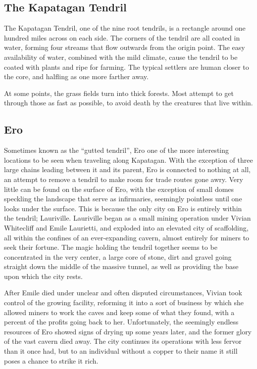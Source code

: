 \begin{multicols}{2}
\section{The Kapatagan Tendril}
The Kapatagan Tendril, one of the nine root tendrils, is a rectangle around one hundred miles across on each side.
The corners of the tendril are all coated in water, forming four streams that flow outwards from the origin point.
The easy availability of water, combined with the mild climate, cause the tendril to be coated with plants and ripe for farming.
The typical settlers are human closer to the core, and halfling as one more farther away. 

At some points, the grass fields turn into thick forests.
Most attempt to get through those as fast as possible, to avoid death by the creatures that live within.

\subsection{Ero}
Sometimes known as the ``gutted tendril'', Ero one of the more interesting locations to be seen when traveling along Kapatagan.
With the exception of three large chains leading between it and its parent, Ero is connected to nothing at all, an attempt to remove a tendril to make room for trade routes gone awry.
Very little can be found on the surface of Ero, with the exception of small domes speckling the landscape that serve as infirmaries, seemingly pointless until one looks under the surface.
This is because the only city on Ero is entirely within the tendril; Lauriville.
Lauriville began as a small mining operation under Vivian Whitecliff and Emile Laurietti, and exploded into an elevated city of scaffolding, all within the confines of an ever-expanding cavern, almost entirely for miners to seek their fortune.
The magic holding the tendril together seems to be concentrated in the very center, a large core of stone, dirt and gravel going straight down the middle of the massive tunnel, as well as providing the base upon which the city rests. 

After Emile died under unclear and often disputed circumstances, Vivian took control of the growing facility, reforming it into a sort of business by which she allowed miners to work the caves and keep some of what they found, with a percent of the profits going back to her. 
Unfortunately, the seemingly endless resources of Ero showed signs of drying up some years later, and the former glory of the vast cavern died away. 
The city continues its operations with less fervor than it once had, but to an individual without a copper to their name it still poses a chance to strike it rich.


\end{multicols}

